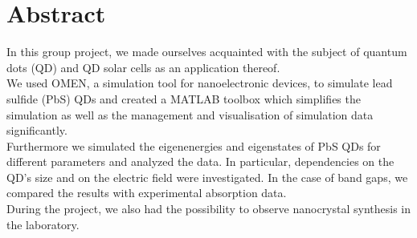 \chapter*{Abstract}

In this group project, we made ourselves acquainted with the subject of quantum dots (QD) and QD solar cells as an application thereof. \\

We used OMEN, a simulation tool for nanoelectronic devices, to simulate lead sulfide (PbS) QDs and created a MATLAB toolbox which
simplifies the simulation as well as the management and visualisation of simulation data significantly.\\

Furthermore we simulated the eigenenergies and eigenstates of PbS QDs for different parameters and analyzed the data. In particular, dependencies on the QD's size and on the electric field were investigated. In the case of band gaps, we compared the results with experimental absorption data.\\

During the project, we also had the possibility to observe nanocrystal synthesis in the laboratory.